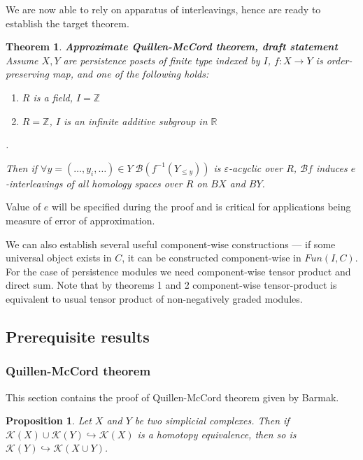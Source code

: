 \documentclass[a4paper, 12pt]{article}
\newtheorem{proposition}{Proposition}
\newtheorem{theorem}{Theorem}
\theoremstyle{definition}
\theoremstyle{remark}
\begin{document}
We are now able to rely on apparatus of interleavings, hence are ready to establish the target theorem.\\

\begin{theorem} \textbf{Approximate Quillen-McCord theorem, draft statement}\\
  Assume $X, Y$ are persistence posets of finite type indexed by $I$, $f : X \to Y$ is order-preserving map, and one of the following holds:\\
  \begin{enumerate}
    \item $R$ is a field, $I = \mathbb{Z}$
    \item $R = \mathbb{Z}$, $I$ is an infinite additive subgroup in $\mathbb{R}$
  \end{enumerate}.

  Then if $\forall y=(\ldots,y_i,\ldots) \in Y\;\mathcal{B}(f^{-1}(Y_{\leqslant y}))$ is $\varepsilon$-acyclic over $R$, $\mathcal{B}f$ induces $e$-interleavings of all homology spaces over $R$ on $BX$ and $BY$.\\
\end{theorem}

Value of $e$ will be specified during the proof and is critical for applications being measure of error of approximation.

We can also establish several useful component-wise constructions --- if some universal object exists in $C$, it can be constructed component-wise in $Fun(I,C)$. For the case of persistence modules we need component-wise tensor product and direct sum. Note that by theorems 1 and 2 component-wise tensor-product is equivalent to usual tensor product of non-negatively graded modules.

\subsection{Prerequisite results}

\subsubsection{Quillen-McCord theorem}

This section contains the proof of Quillen-McCord theorem given by Barmak.

\begin{proposition} {\cite[Proposition 2.1]{Bar11}}
  Let $X$ and $Y$ be two simplicial complexes. Then if $\mathcal{K}(X) \cup \mathcal{K}(Y) \hookrightarrow \mathcal{K}(X)$ is a homotopy equivalence, then so is $\mathcal{K}(Y) \hookrightarrow \mathcal{K}(X \cup Y)$.
\end{proposition}
\end{document}
